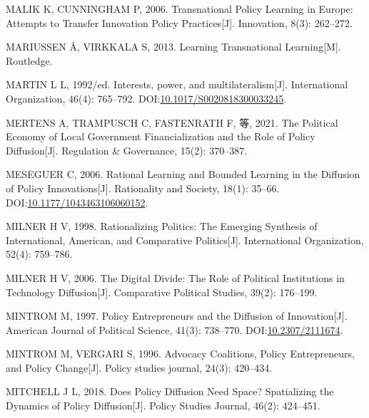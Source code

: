 \documentclass[
  12pt,
]{ctexart}
\newlength{\cslhangindent}
\newlength{\cslentryspacingunit} %
\newenvironment{CSLReferences}[2] %
 {%
  \setlength{\parindent}{0pt}
  \ifodd #1
  \let\oldpar\par
  \def\par{\hangindent=\cslhangindent\oldpar}
  \fi
  \setlength{\parskip}{#2\cslentryspacingunit}
 }%
 {}
\begin{document}
\begin{CSLReferences}{1}{0}
\leavevmode{}%
MALIK K, CUNNINGHAM P, 2006. Transnational Policy Learning in {Europe}: {Attempts} to Transfer Innovation Policy Practices{[}J{]}. Innovation, 8(3): 262--272.

\leavevmode{}%
MARIUSSEN Å, VIRKKALA S, 2013. Learning Transnational Learning{[}M{]}. {Routledge}.

\leavevmode{}%
MARTIN L L, 1992/ed. {Interests, power, and multilateralism}{[}J{]}. International Organization, 46(4): 765--792. DOI:\href{https://doi.org/10.1017/S0020818300033245}{10.1017/S0020818300033245}.

\leavevmode{}%
MERTENS A, TRAMPUSCH C, FASTENRATH F, 等, 2021. The Political Economy of Local Government Financialization and the Role of Policy Diffusion{[}J{]}. Regulation \& Governance, 15(2): 370--387.

\leavevmode{}%
MESEGUER C, 2006. Rational {Learning} and {Bounded Learning} in the {Diffusion} of {Policy Innovations}{[}J{]}. Rationality and Society, 18(1): 35--66. DOI:\href{https://doi.org/10.1177/1043463106060152}{10.1177/1043463106060152}.

\leavevmode{}%
MILNER H V, 1998. Rationalizing Politics: {The} Emerging Synthesis of International, {American}, and Comparative Politics{[}J{]}. International Organization, 52(4): 759--786.

\leavevmode{}%
MILNER H V, 2006. The Digital Divide: {The} Role of Political Institutions in Technology Diffusion{[}J{]}. Comparative Political Studies, 39(2): 176--199.

\leavevmode{}%
MINTROM M, 1997. Policy {Entrepreneurs} and the {Diffusion} of {Innovation}{[}J{]}. American Journal of Political Science, 41(3): 738--770. DOI:\href{https://doi.org/10.2307/2111674}{10.2307/2111674}.

\leavevmode{}%
MINTROM M, VERGARI S, 1996. Advocacy Coalitions, Policy Entrepreneurs, and Policy Change{[}J{]}. Policy studies journal, 24(3): 420--434.

\leavevmode{}%
MITCHELL J L, 2018. Does Policy Diffusion Need Space? {Spatializing} the Dynamics of Policy Diffusion{[}J{]}. Policy Studies Journal, 46(2): 424--451.


\end{CSLReferences}
\end{document}
